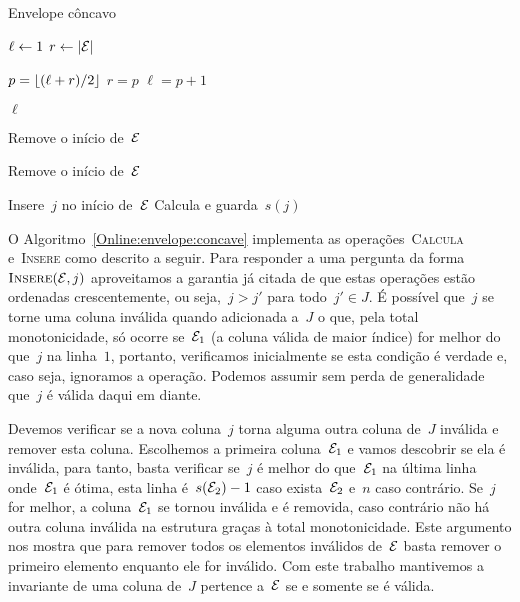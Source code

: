 \begin{algorithm}[h]
\caption{Envelope côncavo}
\label{Online:envelope:concave}
\begin{algorithmic}[1]
    \State $\ell \leftarrow 1$
    \State $r \leftarrow |\mathcal{E}|$
    
        \State $p = \lfloor(\ell+r)/2\rfloor$
            \State $r = p$
        \Else
            \State $\ell = p + 1$
        \EndIf
    \EndWhile

    \State \Return $\ell$
\EndFunction

        \State \Return
    \EndIf
    
        \State Remove o início de~$\mathcal{E}$
    \EndWhile

        \State Remove o início de~$\mathcal{E}$
    \EndIf

    \State Insere~$j$ no início de~$\mathcal{E}$
    \State Calcula e guarda~$s(j)$
\EndFunction
\end{algorithmic}
\end{algorithm}

O Algoritmo~\ref{Online:envelope:concave} implementa as operações~\textsc{Calcula} e~\textsc{Insere} como descrito a seguir. Para responder a uma pergunta da forma~$\textsc{Insere}(\mathcal{E},j)$ aproveitamos a garantia já citada de que estas operações estão ordenadas crescentemente, ou seja,~$j > j'$ para todo~$j' \in J$. É possível que~$j$ se torne uma coluna inválida quando adicionada a~$J$ o que, pela total monotonicidade, só ocorre se~$\mathcal{E}_1$ (a coluna válida de maior índice) for melhor do que~$j$ na linha~$1$, portanto, verificamos inicialmente se esta condição é verdade e, caso seja, ignoramos a operação. Podemos assumir sem perda de generalidade que~$j$ é válida daqui em diante.

Devemos verificar se a nova coluna~$j$ torna alguma outra coluna de~$J$ inválida e remover esta coluna. Escolhemos a primeira coluna~$\mathcal{E}_1$ e vamos descobrir se ela é inválida, para tanto, basta verificar se~$j$ é melhor do que~$\mathcal{E}_1$ na última linha onde~$\mathcal{E}_1$ é ótima, esta linha é~${ s(\mathcal{E}_2) - 1 }$ caso exista~$\mathcal{E}_2$ e~$n$ caso contrário. Se~$j$ for melhor, a coluna~$\mathcal{E}_1$ se tornou inválida e é removida, caso contrário não há outra coluna inválida na estrutura graças à total monotonicidade. Este argumento nos mostra que para remover todos os elementos inválidos de~$\mathcal{E}$ basta remover o primeiro elemento enquanto ele for inválido. Com este trabalho mantivemos a invariante de uma coluna de~$J$ pertence a~$\mathcal{E}$ se e somente se é válida.

